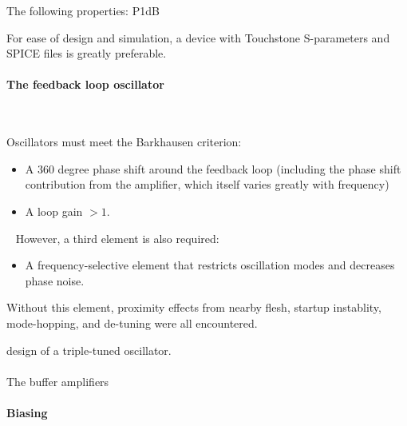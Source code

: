 \documentclass[fleqn,10pt]{article}
\begin{document}
\clearpage


\begin{multicols}{1}

\noindent{}
%
The following properties: P1dB

For ease of design and simulation, a device with Touchstone S-parameters and SPICE files is greatly preferable.
%
\paragraph{\textbf{The feedback loop oscillator}}\

Oscillators must meet the Barkhausen criterion:

\begin{itemize}

\item A 360 degree phase shift around the feedback loop (including the phase shift contribution from the amplifier, which itself varies greatly with frequency)
\item A loop gain $>1.$ 

\end{itemize}\
%
However, a third element is also required:
%
\begin{itemize}
\item A frequency-selective element that restricts oscillation modes and decreases phase noise.
\end{itemize}
%
Without this element, proximity effects from nearby flesh, startup instablity, mode-hopping, and de-tuning were all encountered. 



 design of a triple-tuned oscillator.


\paragraph{}
The buffer amplifiers 

\paragraph{Biasing}\


\end{multicols}
\end{document}
